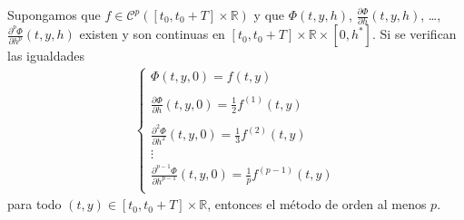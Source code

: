 \begin{teo}
Supongamos que $f \in \mathscr{C}^p([t_0,t_0+T] \times \mathbb{R})$ y que $\Phi(t,y,h)$, $\frac{\partial \Phi}{\partial h}(t,y,h)$, \ldots, $\frac{\partial^p \Phi}{\partial h^p}(t,y,h)$ existen y son continuas en $[t_0,t_0+T] \times \mathbb{R} \times [0,h^*]$. Si se verifican las igualdades
\begin{align*}
    \left\{ \begin{array}{lcc}
             \Phi(t,y,0) = f(t,y)\\
            \\ \frac{\partial \Phi}{\partial h}(t,y,0) =  \frac{1}{2}f^{(1)}(t,y) \\
            \\  \frac{\partial^2 \Phi}{\partial h^2}(t,y,0) = \frac{1}{3}f^{(2)}(t,y) \\
             \vdots \\
             \frac{\partial^{p-1} \Phi}{\partial h^{p-1}}(t,y,0) = \frac{1}{p}f^{(p-1)}(t,y) \\
             \end{array}
   \right.
\end{align*}
para todo $(t,y) \in [t_0,t_0+T] \times \mathbb{R}$, entonces el método de orden al menos $p$.
\end{teo}


